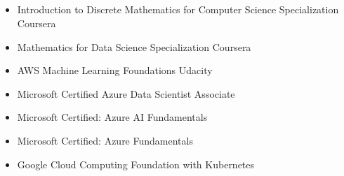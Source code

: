 \documentclass[10pt,legalpaper,ragged2e,withhyper]{altacv}
\newenvironment{sloppypar*}{\sloppy\ignorespaces}{\par}
\begin{document}


\makecvheader



\begin{paracol}{2}
    \begin{sloppypar*}
        \\
        \medskip
        \\
        \medskip
    \end{sloppypar*}

    \\
    \\

    \begin{sloppypar*}
        \begin{itemize}
            \item Introduction to Discrete Mathematics for Computer Science Specialization Coursera
            \item Mathematics for Data Science Specialization Coursera
            \item AWS Machine Learning Foundations Udacity
            \item Microsoft Certified Azure Data Scientist Associate
            \item Microsoft Certified: Azure AI Fundamentals
            \item Microsoft Certified: Azure Fundamentals
            \item Google Cloud Computing Foundation with Kubernetes
        \end{itemize}
    \end{sloppypar*}


\end{paracol}
\end{document}
